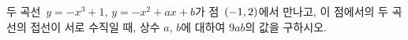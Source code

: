 두 곡선~$y=-x^3+1$, $y=-x^2+ax+b$가 점~$(-1{,}\mkern3mu\mathopen{}2)$에서 만나고, 이 점에서의 두 곡선의 접선이 서로 수직일 때, 상수 $a$, $b$에 대하여 $9ab$의 값을 구하시오.

